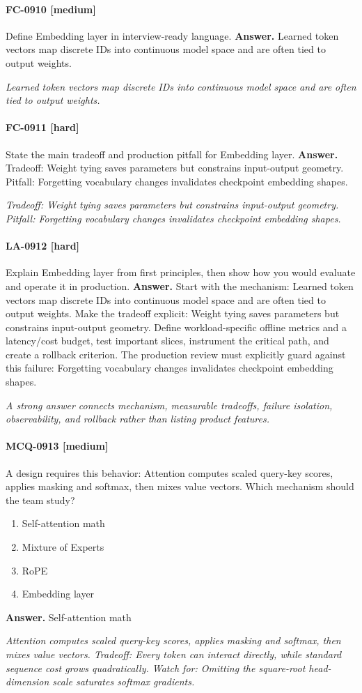 \paragraph{FC-0910 [medium]} Define Embedding layer in interview-ready language.
\noindent\textbf{Answer.} Learned token vectors map discrete IDs into continuous model space and are often tied to output weights.
\par\textit{Learned token vectors map discrete IDs into continuous model space and are often tied to output weights.}
\paragraph{FC-0911 [hard]} State the main tradeoff and production pitfall for Embedding layer.
\noindent\textbf{Answer.} Tradeoff: Weight tying saves parameters but constrains input-output geometry. Pitfall: Forgetting vocabulary changes invalidates checkpoint embedding shapes.
\par\textit{Tradeoff: Weight tying saves parameters but constrains input-output geometry. Pitfall: Forgetting vocabulary changes invalidates checkpoint embedding shapes.}
\paragraph{LA-0912 [hard]} Explain Embedding layer from first principles, then show how you would evaluate and operate it in production.
\noindent\textbf{Answer.} Start with the mechanism: Learned token vectors map discrete IDs into continuous model space and are often tied to output weights. Make the tradeoff explicit: Weight tying saves parameters but constrains input-output geometry. Define workload-specific offline metrics and a latency/cost budget, test important slices, instrument the critical path, and create a rollback criterion. The production review must explicitly guard against this failure: Forgetting vocabulary changes invalidates checkpoint embedding shapes.
\par\textit{A strong answer connects mechanism, measurable tradeoffs, failure isolation, observability, and rollback rather than listing product features.}
\paragraph{MCQ-0913 [medium]} A design requires this behavior: Attention computes scaled query-key scores, applies masking and softmax, then mixes value vectors. Which mechanism should the team study?
\begin{enumerate}[label=\Alph*.]
\item Self-attention math
\item Mixture of Experts
\item RoPE
\item Embedding layer
\end{enumerate}
\noindent\textbf{Answer.} Self-attention math
\par\textit{Attention computes scaled query-key scores, applies masking and softmax, then mixes value vectors. Tradeoff: Every token can interact directly, while standard sequence cost grows quadratically. Watch for: Omitting the square-root head-dimension scale saturates softmax gradients.}
